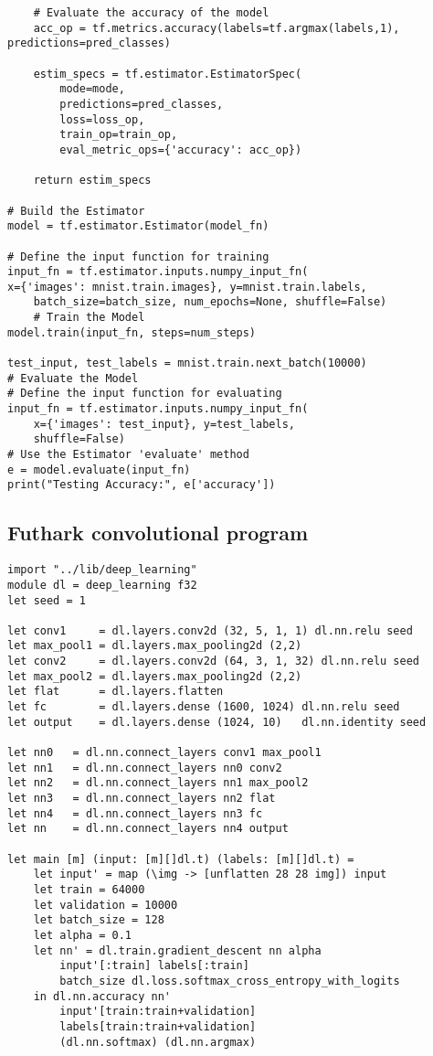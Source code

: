 \begin{verbatim}
	# Evaluate the accuracy of the model
	acc_op = tf.metrics.accuracy(labels=tf.argmax(labels,1), predictions=pred_classes)

	estim_specs = tf.estimator.EstimatorSpec(
		mode=mode,
		predictions=pred_classes,
		loss=loss_op,
		train_op=train_op,
		eval_metric_ops={'accuracy': acc_op})

	return estim_specs

# Build the Estimator
model = tf.estimator.Estimator(model_fn)

# Define the input function for training
input_fn = tf.estimator.inputs.numpy_input_fn(
x={'images': mnist.train.images}, y=mnist.train.labels,
	batch_size=batch_size, num_epochs=None, shuffle=False)
	# Train the Model
model.train(input_fn, steps=num_steps)

test_input, test_labels = mnist.train.next_batch(10000)
# Evaluate the Model
# Define the input function for evaluating
input_fn = tf.estimator.inputs.numpy_input_fn(
	x={'images': test_input}, y=test_labels,
	shuffle=False)
# Use the Estimator 'evaluate' method
e = model.evaluate(input_fn)
print("Testing Accuracy:", e['accuracy'])
\end{verbatim}
\subsection{Futhark convolutional program}
\begin{lstlisting}
import "../lib/deep_learning"
module dl = deep_learning f32
let seed = 1

let conv1     = dl.layers.conv2d (32, 5, 1, 1) dl.nn.relu seed
let max_pool1 = dl.layers.max_pooling2d (2,2)
let conv2     = dl.layers.conv2d (64, 3, 1, 32) dl.nn.relu seed
let max_pool2 = dl.layers.max_pooling2d (2,2)
let flat      = dl.layers.flatten
let fc        = dl.layers.dense (1600, 1024) dl.nn.relu seed
let output    = dl.layers.dense (1024, 10)   dl.nn.identity seed

let nn0   = dl.nn.connect_layers conv1 max_pool1
let nn1   = dl.nn.connect_layers nn0 conv2
let nn2   = dl.nn.connect_layers nn1 max_pool2
let nn3   = dl.nn.connect_layers nn2 flat
let nn4   = dl.nn.connect_layers nn3 fc
let nn    = dl.nn.connect_layers nn4 output

let main [m] (input: [m][]dl.t) (labels: [m][]dl.t) =
	let input' = map (\img -> [unflatten 28 28 img]) input
	let train = 64000
	let validation = 10000
	let batch_size = 128
	let alpha = 0.1
	let nn' = dl.train.gradient_descent nn alpha
		input'[:train] labels[:train]
		batch_size dl.loss.softmax_cross_entropy_with_logits
	in dl.nn.accuracy nn'
		input'[train:train+validation]
		labels[train:train+validation]
		(dl.nn.softmax) (dl.nn.argmax)
\end{lstlisting}
